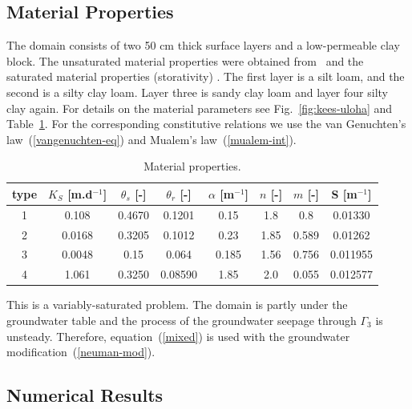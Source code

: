 \documentclass[final,3p,times,twocolumn]{elsarticle}
\begin{document}
\subsection{Material Properties}

The domain consists of two 50 cm thick surface layers and a low-permeable
clay block. The unsaturated material properties were obtained from~\cite{unsat-prop} 
and the saturated material properties (storativity) \cite{pech}. 
The first layer is a silt loam, and the second is a silty clay 
loam. Layer three is sandy clay loam and layer four silty clay again. 
For details on the material parameters see Fig.~\ref{fig:kees-uloha} 
and Table~\ref{Material-properties}. For the corresponding constitutive 
relations we use the van Genuchten's law~(\ref{vangenuchten-eq}) and Mualem's 
law~(\ref{mualem-int}).

\begin{table}[!ht]
\begin{center}
\label{Material-properties}
\caption{Material properties.}
\begin{small}
% 
% 
\begin{tabular}{|c|c|c|c|c|c|c|c|} \hline
type & $K_S$ [m.d${}^{-1}$] & $\theta_s$ [-] & $\theta_r$ [-] & $\alpha$ [m${}^{-1}$] & $n$ [-] & $m$ [-] & S [m${}^{-1}$] \\ \hline \hline
1 & 0.108 & 0.4670 & 0.1201 &0.15 &1.8 & 0.8 & 0.01330 \\\hline
2 & 0.0168 & 0.3205 & 0.1012 & 0.23 & 1.85 & 0.589 & 0.01262  \\\hline
3 & 0.0048 & 0.15 & 0.064 & 0.185 & 1.56 & 0.756 & 0.011955 \\\hline
4 & 1.061 & 0.3250 & 0.08590 & 1.85 & 2.0 & 0.055 & 0.012577  \\\hline
\end{tabular}
\end{small}
\end{center} 
\end{table} 


This is a variably-saturated problem. The domain is partly under the groundwater 
table and the process of the groundwater seepage through $\Gamma_3$ is 
unsteady. Therefore, equation~(\ref{mixed}) is used with the groundwater 
modification~(\ref{neuman-mod}).

\subsection{Numerical Results}
\end{document}
